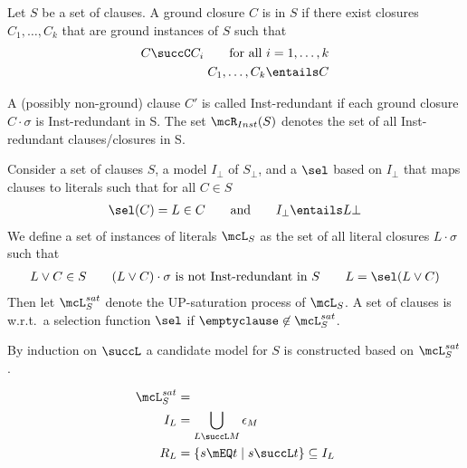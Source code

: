 \begin{definition}
    Let \( S \) be a set of clauses.
    A ground closure \( C \) is  in \( S \)
    if there exist closures \( C_1,\ldots,C_k \)
    that are ground instances of \( S \) such that
    \begin{align*}
        C \succC C_i \tag*{for all \( i=1,\ldots,k \)} \\
        C_1,\ldots,C_k\entails C
    \end{align*}

    A (possibly non-ground) clause \( C' \) is called Inst-redundant
    if each ground closure \( C\cdot\sigma \) is Inst-redundant in S.
    The set \( \mcR_{Inst}(S) \) denotes the set of all Inst-redundant clauses/closures in S.
\end{definition}

\begin{definition}
    Consider a set of clauses \( S \), a model \( I_\bot \) of \( S_\bot \),
    and a  \( \sel \) based on \( I_\bot \)
    that maps clauses to literals such that for all \( C\in S \)
    \begin{gather*}
        \sel(C)=L \in C
        \qquad
        \text{and}
        \qquad
        I_\bot \entails L\bot
    \end{gather*}
    We define a set of  instances of literals \( \mcL_S \)
    as the set of all literal closures \( L\cdot\sigma \) such that
    \begin{gather*}
        L\lor C\in S
        \qquad
        (L\lor C)\cdot\sigma\text{ is not Inst-redundant in }S
        \qquad
        L = \sel(L\lor C)
    \end{gather*}
    Then let \( \mcL_S^{sat} \) denote the UP-saturation process of \( \mcL_S \).
    A set of clauses is  w.r.t.~a selection function \( \sel \)
    if \( \emptyclause\not\in\mcL_S^{sat} \).
\end{definition}

\begin{definition}
    By induction on \( \succL \)
    a candidate model for \( S \) is constructed
    based on \( \mcL_S^{sat} \).

    \begin{align*}
        \mcL_S^{sat} &=
        \\
        I_L &= \bigcup_{L \succL M}
            \epsilon_M
        \\
        R_L &=  \{
            s\mEQ t \mid s\succL t
        \} \subseteq I_L
    \end{align*}

\end{definition}

